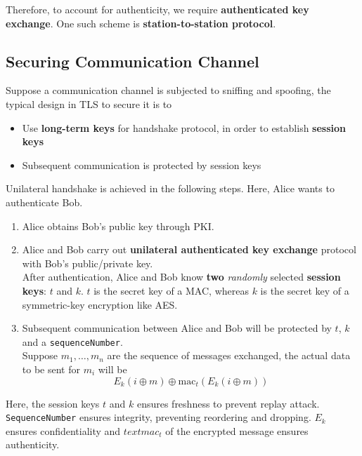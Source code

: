\documentclass[12pt]{article}
\theoremstyle{definition}
\begin{document}
Therefore, to account for authenticity, we require \textbf{authenticated key exchange}. One such scheme is \textbf{station-to-station protocol}.
\subsection{Securing Communication Channel}  
Suppose a communication channel is subjected to sniffing and spoofing, the typical design in TLS to secure it is to 
\begin{itemize}
  \item Use \textbf{long-term keys} for handshake protocol, in order to establish \textbf{session keys}
  \item Subsequent communication is protected by session keys
\end{itemize}
Unilateral handshake is achieved in the following steps. Here, Alice wants to authenticate Bob.
\begin{enumerate}
  \item Alice obtains Bob's public key through PKI.
  \item Alice and Bob carry out \textbf{unilateral authenticated key exchange} protocol with Bob's public/private key.\\After authentication, Alice and Bob know \textbf{two} \textit{randomly} selected \textbf{session keys}: $t$ and $k$. $t$ is the secret key of a MAC, whereas $k$ is the secret key of a symmetric-key encryption like AES.
  \item Subsequent communication between Alice and Bob will be protected by $t$, $k$ and a \texttt{sequenceNumber}.\\ Suppose $m_1,\ldots, m_n$ are the sequence of messages exchanged, the actual data to be sent for $m_i$ will be
  \[
E_k(i\oplus m)\oplus \text{mac}_t(E_k(i\oplus m))
  \]
\end{enumerate}
Here, the session keys $t$ and $k$ ensures freshness to prevent replay attack. \texttt{SequenceNumber} ensures integrity, preventing reordering and dropping. $E_k$ ensures confidentiality and $text{mac}_t$ of the encrypted message ensures authenticity.












\clearpage
\end{document}

